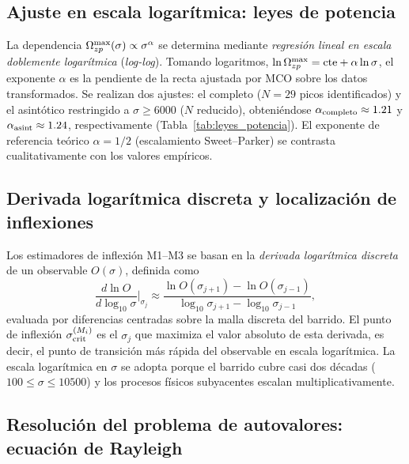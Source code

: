 \subsection{Ajuste en escala logarítmica: leyes de potencia}
\label{ap:est:loglog}

\primerparrafo La dependencia $\Omega_{zp}^{\max}(\sigma)\propto\sigma^\alpha$ se determina mediante \emph{regresión lineal en escala doblemente logarítmica} (\emph{log-log}). Tomando logaritmos, $\ln\Omega_{zp}^{\max} = \mathrm{cte} + \alpha\ln\sigma$, el exponente $\alpha$ es la pendiente de la recta ajustada por MCO sobre los datos transformados. Se realizan dos ajustes: el completo ($N=29$ picos identificados) y el asintótico restringido a $\sigma\ge6000$ ($N$ reducido), obteniéndose $\alpha_{\rm completo}\approx1.21$ y $\alpha_{\rm asint}\approx1.24$, respectivamente (Tabla~\ref{tab:leyes_potencia}). El exponente de referencia teórico $\alpha=1/2$ (escalamiento Sweet--Parker) se contrasta cualitativamente con los valores empíricos.

\subsection{Derivada logarítmica discreta y localización de inflexiones}
\label{ap:est:derlog}

\primerparrafo Los estimadores de inflexión M1--M3 se basan en la \emph{derivada logarítmica discreta} de un observable $O(\sigma)$, definida como
\begin{equation}
    \frac{d\ln O}{d\log_{10}\sigma}\bigg|_{\sigma_j}
    \approx
    \frac{\ln O(\sigma_{j+1}) - \ln O(\sigma_{j-1})}{\log_{10}\sigma_{j+1} - \log_{10}\sigma_{j-1}},
\end{equation}
evaluada por diferencias centradas sobre la malla discreta del barrido. El punto de inflexión $\sigma_{\mathrm{crit}}^{(M_i)}$ es el $\sigma_j$ que maximiza el valor absoluto de esta derivada, es decir, el punto de transición más rápida del observable en escala logarítmica. La escala logarítmica en $\sigma$ se adopta porque el barrido cubre casi dos décadas ($100\le\sigma\le10500$) y los procesos físicos subyacentes escalan multiplicativamente.

\subsection{Resolución del problema de autovalores: ecuación de Rayleigh}
\label{ap:est:autovalores}

